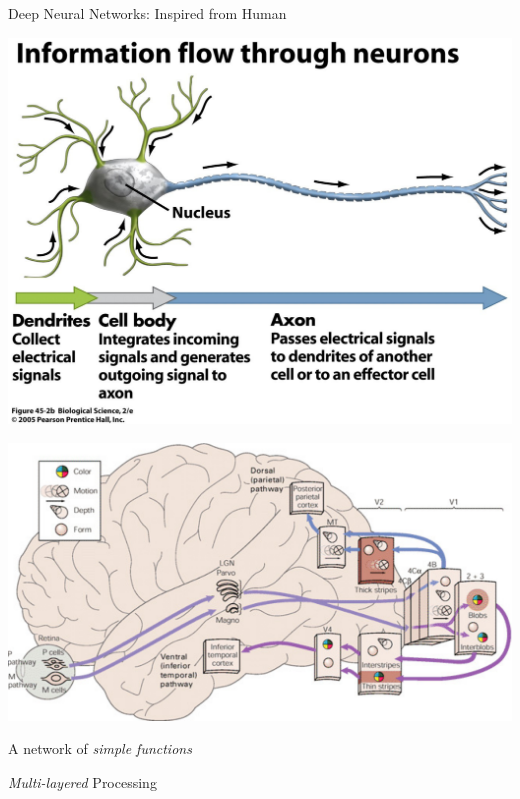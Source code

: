 \documentclass[first=dgreen,second=purple,logo=yellowexc]{aaltoslides}
\begin{document}
\begin{frame}{Deep Neural Networks: Inspired from Human}
     \vspace{3mm}
     \begin{minipage}{0.37\textwidth}
         \centering
         \includegraphics[width=0.9\columnwidth]{neuron.pdf}
     \end{minipage}
     \hfill
     \begin{minipage}{0.37\textwidth}
         \centering
         \includegraphics[width=0.9\columnwidth]{visual_pathway.pdf}
         \\
     \end{minipage}
     \begin{minipage}{0.37\textwidth}
         \centering
         \small
         A network of \textit{simple functions}
     \end{minipage}
     \hfill
     \begin{minipage}{0.4\textwidth}
         \centering
         \small
         \textit{Multi-layered} Processing
     \end{minipage}

\end{frame}
\end{document}
